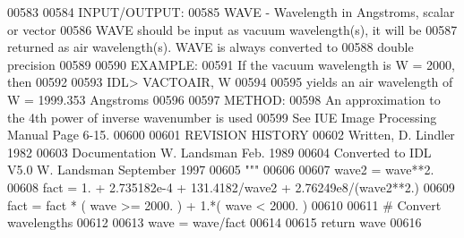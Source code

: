 \begin{DoxyCode}
00583 \textcolor{stringliteral}{}
00584 \textcolor{stringliteral}{INPUT/OUTPUT:}
00585 \textcolor{stringliteral}{WAVE - Wavelength in Angstroms, scalar or vector}
00586 \textcolor{stringliteral}{WAVE should be input as vacuum wavelength(s), it will be}
00587 \textcolor{stringliteral}{returned as air wavelength(s). WAVE is always converted to}
00588 \textcolor{stringliteral}{double precision}
00589 \textcolor{stringliteral}{}
00590 \textcolor{stringliteral}{EXAMPLE:}
00591 \textcolor{stringliteral}{If the vacuum wavelength is W = 2000, then}
00592 \textcolor{stringliteral}{}
00593 \textcolor{stringliteral}{IDL> VACTOAIR, W}
00594 \textcolor{stringliteral}{}
00595 \textcolor{stringliteral}{yields an air wavelength of W = 1999.353 Angstroms}
00596 \textcolor{stringliteral}{}
00597 \textcolor{stringliteral}{METHOD:}
00598 \textcolor{stringliteral}{An approximation to the 4th power of inverse wavenumber is used}
00599 \textcolor{stringliteral}{See IUE Image Processing Manual Page 6-15.}
00600 \textcolor{stringliteral}{}
00601 \textcolor{stringliteral}{REVISION HISTORY}
00602 \textcolor{stringliteral}{Written, D. Lindler 1982}
00603 \textcolor{stringliteral}{Documentation W. Landsman Feb. 1989}
00604 \textcolor{stringliteral}{Converted to IDL V5.0 W. Landsman September 1997}
00605 \textcolor{stringliteral}{    """}
00606 
00607     wave2 = wave**2.
00608     fact = 1. + 2.735182e-4 + 131.4182/wave2 + 2.76249e8/(wave2**2.)
00609     fact = fact * ( wave >= 2000. ) + 1.*( wave < 2000. )
00610     
00611     \textcolor{comment}{# Convert wavelengths}
00612     
00613     wave = wave/fact
00614     
00615     \textcolor{keywordflow}{return} wave
00616 
\end{DoxyCode}

